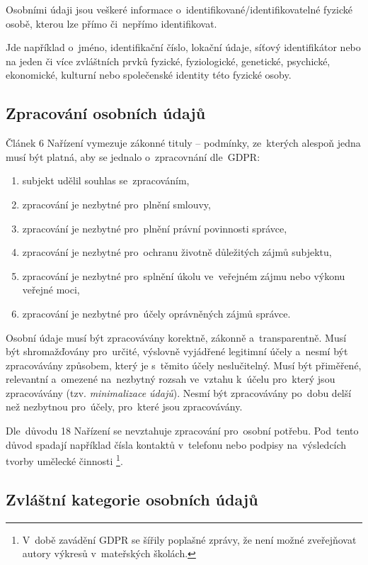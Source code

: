 Osobními údaji jsou veškeré informace o~identifikované/identifikovatelné fyzické osobě, kterou lze přímo či~nepřímo identifikovat.

Jde například o~jméno, identifikační číslo, lokační údaje, síťový identifikátor nebo na jeden či více zvláštních prvků fyzické, fyziologické, genetické, psychické, ekonomické, kulturní nebo společenské identity této fyzické osoby.

\subsection{Zpracování osobních údajů}

Článek 6 Nařízení vymezuje zákonné tituly -- podmínky, ze~kterých alespoň jedna musí být platná, aby se jednalo o~zpracovnání dle~GDPR:

\begin{enumerate}[label=\alph*)]
\item subjekt udělil souhlas se~zpracováním,
\item zpracování je nezbytné pro~plnění smlouvy,
\item zpracování je nezbytné pro~plnění právní povinnosti správce,
\item zpracování je nezbytné pro~ochranu životně důležitých zájmů subjektu,
\item zpracování je nezbytné pro~splnění úkolu ve~veřejném zájmu nebo výkonu veřejné moci,
\item zpracování je nezbytné pro~účely oprávněných zájmů správce.
\end{enumerate}

Osobní údaje musí být zpracovávány korektně, zákonně a~transparentně.
Musí být shromažďovány pro~určité, výslovně vyjádřené legitimní účely a~nesmí být zpracovávány způsobem, který je s~těmito účely neslučitelný.
Musí být přiměřené, relevantní a~omezené na~nezbytný rozsah ve~vztahu k~účelu pro~který jsou zpracovávány (tzv. \emph{minimalizace údajů}).
Nesmí být zpracovávány po~dobu delší než nezbytnou pro~účely, pro~které jsou zpracovávány.

Dle~důvodu 18 Nařízení se nevztahuje zpracování pro~osobní potřebu.
Pod~tento důvod spadají například čísla kontaktů v~telefonu nebo podpisy na~výsledcích tvorby umělecké činnosti%
\footnote{V~době zavádění GDPR se šířily poplašné zprávy, že není možné zveřejňovat autory výkresů v~mateřských školách.}.

\subsection{Zvláštní kategorie osobních údajů}

